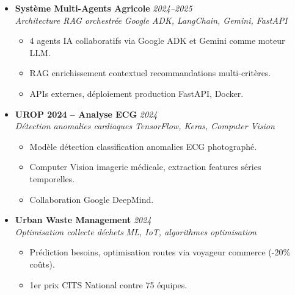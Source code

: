 \documentclass[a4paper,11pt]{article}
\begin{document}
\begin{itemize}[leftmargin=0.5cm, nosep]
    \item \textbf{Syst\`eme Multi-Agents Agricole} \hfill \textit{2024--2025} \\
    \textit{Architecture RAG orchestr\'ee} \hfill \textit{Google ADK, LangChain, Gemini, FastAPI}
    \vspace{-2pt}
    \begin{itemize}[leftmargin=0.4cm, nosep, label=\tiny$\bullet$]
        \item \small{4 agents IA collaboratifs via Google ADK et Gemini comme moteur LLM.}
        \item \small{RAG enrichissement contextuel recommandations multi-crit\`eres.}
        \item \small{APIs externes, d\'eploiement production FastAPI, Docker.}
    \end{itemize}
    \vspace{3pt}

    \item \textbf{UROP 2024 -- Analyse ECG} \hfill \textit{2024} \\
    \textit{D\'etection anomalies cardiaques} \hfill \textit{TensorFlow, Keras, Computer Vision}
    \vspace{-2pt}
    \begin{itemize}[leftmargin=0.4cm, nosep, label=\tiny$\bullet$]
        \item \small{Mod\`ele d\'etection classification anomalies ECG photograph\'e.}
        \item \small{Computer Vision imagerie m\'edicale, extraction features s\'eries temporelles.}
        \item \small{Collaboration Google DeepMind.}
    \end{itemize}
    \vspace{3pt}

    \item \textbf{Urban Waste Management} \hfill \textit{2024} \\
    \textit{Optimisation collecte d\'echets} \hfill \textit{ML, IoT, algorithmes optimisation}
    \vspace{-2pt}
    \begin{itemize}[leftmargin=0.4cm, nosep, label=\tiny$\bullet$]
        \item \small{Pr\'ediction besoins, optimisation routes via voyageur commerce (-20\% co\^uts).}
        \item \small{1er prix CITS National contre 75 \'equipes.}
    \end{itemize}
    \vspace{3pt}


\end{itemize}
\end{document}
